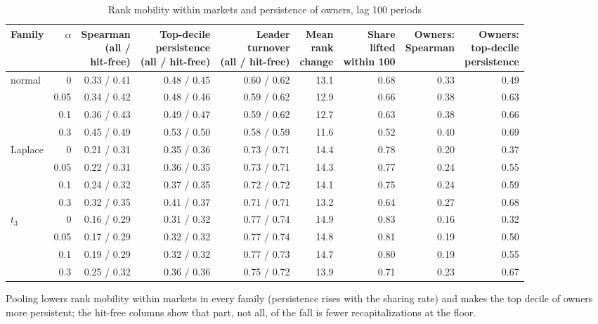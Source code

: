 \begin{table}
\centering
\caption{Rank mobility within markets and persistence of owners, lag 100 periods}
\label{tab:a17_rank_mobility}
\small
\begin{tabular}{lrrrrrrrr}
\toprule
Family & $\alpha$ & \makecell[b]{Spearman\\{}(all /\\{}hit-free)} & \makecell[b]{Top-decile\\{}persistence\\{}(all / hit-free)} & \makecell[b]{Leader\\{}turnover\\{}(all / hit-free)} & \makecell[b]{Mean\\{}rank\\{}change} & \makecell[b]{Share\\{}lifted\\{}within 100} & \makecell[b]{Owners:\\{}Spearman} & \makecell[b]{Owners:\\{}top-decile\\{}persistence} \\
\midrule
normal & 0 & 0.33 / 0.41 & 0.48 / 0.45 & 0.60 / 0.62 & 13.1 & 0.68 & 0.33 & 0.49 \\
 & 0.05 & 0.34 / 0.42 & 0.48 / 0.46 & 0.59 / 0.62 & 12.9 & 0.66 & 0.38 & 0.63 \\
 & 0.1 & 0.36 / 0.43 & 0.49 / 0.47 & 0.59 / 0.62 & 12.7 & 0.63 & 0.38 & 0.66 \\
 & 0.3 & 0.45 / 0.49 & 0.53 / 0.50 & 0.58 / 0.59 & 11.6 & 0.52 & 0.40 & 0.69 \\
Laplace & 0 & 0.21 / 0.31 & 0.35 / 0.36 & 0.73 / 0.71 & 14.4 & 0.78 & 0.20 & 0.37 \\
 & 0.05 & 0.22 / 0.31 & 0.36 / 0.35 & 0.73 / 0.71 & 14.3 & 0.77 & 0.24 & 0.55 \\
 & 0.1 & 0.24 / 0.32 & 0.37 / 0.35 & 0.72 / 0.72 & 14.1 & 0.75 & 0.24 & 0.59 \\
 & 0.3 & 0.32 / 0.35 & 0.41 / 0.37 & 0.71 / 0.71 & 13.2 & 0.64 & 0.27 & 0.68 \\
$t_3$ & 0 & 0.16 / 0.29 & 0.31 / 0.32 & 0.77 / 0.74 & 14.9 & 0.83 & 0.16 & 0.32 \\
 & 0.05 & 0.17 / 0.29 & 0.32 / 0.32 & 0.77 / 0.74 & 14.8 & 0.81 & 0.19 & 0.50 \\
 & 0.1 & 0.19 / 0.29 & 0.32 / 0.32 & 0.77 / 0.73 & 14.7 & 0.80 & 0.19 & 0.55 \\
 & 0.3 & 0.25 / 0.32 & 0.36 / 0.36 & 0.75 / 0.72 & 13.9 & 0.71 & 0.23 & 0.67 \\
\bottomrule
\end{tabular}
\par\smallskip\begin{minipage}{0.95\linewidth}\footnotesize Pooling lowers rank mobility within markets in every family (persistence rises with the sharing rate) and makes the top decile of owners more persistent; the hit-free columns show that part, not all, of the fall is fewer recapitalizations at the floor.\end{minipage}
\end{table}
